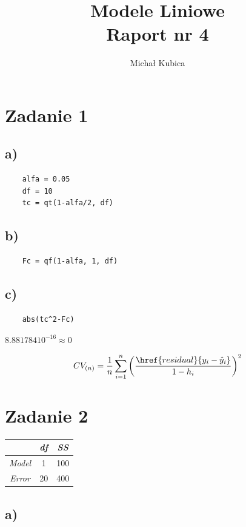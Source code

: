 \documentclass[9pt]{article}  %
\begin{document}
\author{Michał Kubica}
\title{Modele Liniowe \\ Raport nr 4}       
\maketitle                     %

\section{Zadanie 1}            %
  
  \subsection{a)}
    \begin{lstlisting}
    alfa = 0.05
    df = 10
    tc = qt(1-alfa/2, df)
    \end{lstlisting}  
  \subsection{b)}
    \begin{lstlisting}
    Fc = qf(1-alfa, 1, df)
    \end{lstlisting} 
  \subsection{c)}
    \begin{lstlisting}
    abs(tc^2-Fc)
    \end{lstlisting} 
    
    $8.881784 10^{-16} \approx 0$



$$CV_{(n)} = \frac{1}{n} \sum^n_{i=1} \left ( \frac{ \href{residual}{y_i - \hat{y}_i} }{ 1-h_i} \right ) ^2$$

  
\section{Zadanie 2}
  \begin{tabular}{c|c|c}
     & \textit{df} & \textit{SS} \\
    \hline
    \textit{Model} & 1 & 100 \\
    \hline
    \textit{Error} & 20 & 400 \\
  \end{tabular} 


  \subsection{a)}
  
\end{document}
